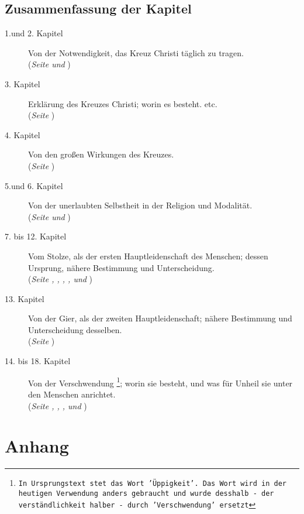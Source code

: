 \documentclass[a5paper,pagesize,9pt]{scrbook}
\begin{document}
\chapter{Zusammenfassung der Kapitel}
\begin{description}
\item[1.und 2. Kapitel] Von der Notwendigkeit, das Kreuz Christi täglich zu
tragen.
\\(\textit{Seite \pageref{kap1} und  \pageref{kap2}})
\item[3. Kapitel] Erklärung des Kreuzes Christi; worin es besteht. etc.
\\(\textit{Seite \pageref{kap3}})
\item[4. Kapitel] Von den großen Wirkungen des Kreuzes.
\\(\textit{Seite \pageref{kap4}})
\item[5.und 6. Kapitel] Von der unerlaubten Selbstheit in der Religion und
Modalität.
\\(\textit{Seite \pageref{kap5} und \pageref{kap6}})
\item[7. bis 12. Kapitel] Vom Stolze, als der ersten Hauptleidenschaft des
Menschen; dessen Ursprung, nähere Bestimmung und Unterscheidung.
\\(\textit{Seite \pageref{kap7}, \pageref{kap8}, \pageref{kap9}, \pageref{kap10}, \pageref{kap11} und \pageref{kap12}})
\item[13. Kapitel] Von der Gier, als der zweiten Hauptleidenschaft; nähere
Bestimmung und Unterscheidung desselben.
\\(\textit{Seite \pageref{kap13}})
\item[14. bis 18. Kapitel] Von der Verschwendung
\footnote{\texttt{In Ursprungstext stet
das Wort 'Üppigkeit'. Das Wort wird in der heutigen Verwendung anders
gebraucht und wurde desshalb - der verständlichkeit halber - durch
'Verschwendung' ersetzt}}; worin sie besteht, und was für Unheil sie unter den
Menschen anrichtet.
\\(\textit{Seite \pageref{kap14}, \pageref{kap15}, \pageref{kap16},
\pageref{kap17} und \pageref{kap18}})
\end{description}




















\backmatter

\part{Anhang}

\printindex
\end{document}
